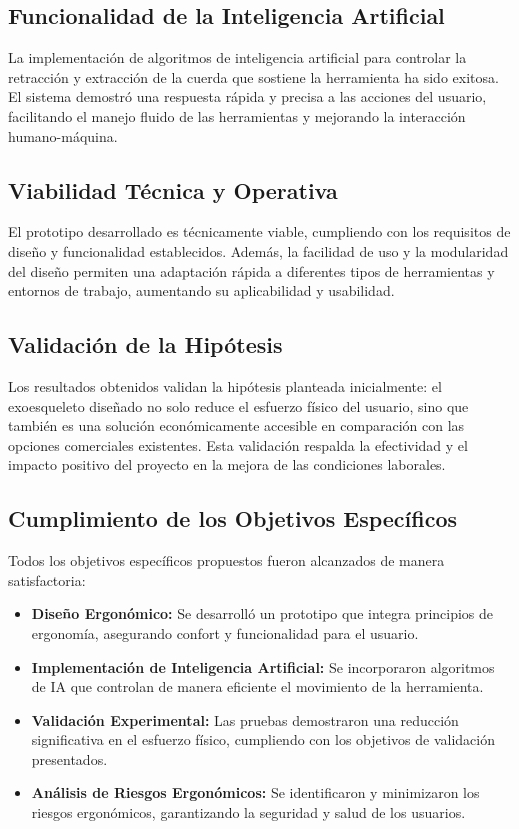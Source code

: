 \subsection{Funcionalidad de la Inteligencia Artificial}
La implementación de algoritmos de inteligencia artificial para controlar la retracción y extracción de la cuerda que sostiene la herramienta ha sido exitosa. El sistema demostró una respuesta rápida y precisa a las acciones del usuario, facilitando el manejo fluido de las herramientas y mejorando la interacción humano-máquina.

\subsection{Viabilidad Técnica y Operativa}
El prototipo desarrollado es técnicamente viable, cumpliendo con los requisitos de diseño y funcionalidad establecidos. Además, la facilidad de uso y la modularidad del diseño permiten una adaptación rápida a diferentes tipos de herramientas y entornos de trabajo, aumentando su aplicabilidad y usabilidad.

\subsection{Validación de la Hipótesis}
Los resultados obtenidos validan la hipótesis planteada inicialmente: el exoesqueleto diseñado no solo reduce el esfuerzo físico del usuario, sino que también es una solución económicamente accesible en comparación con las opciones comerciales existentes. Esta validación respalda la efectividad y el impacto positivo del proyecto en la mejora de las condiciones laborales.

\subsection{Cumplimiento de los Objetivos Específicos}
Todos los objetivos específicos propuestos fueron alcanzados de manera satisfactoria:
\begin{itemize}
    \item \textbf{Diseño Ergonómico:} Se desarrolló un prototipo que integra principios de ergonomía, asegurando confort y funcionalidad para el usuario.
    \item \textbf{Implementación de Inteligencia Artificial:} Se incorporaron algoritmos de IA que controlan de manera eficiente el movimiento de la herramienta.
    \item \textbf{Validación Experimental:} Las pruebas demostraron una reducción significativa en el esfuerzo físico, cumpliendo con los objetivos de validación presentados.
    \item \textbf{Análisis de Riesgos Ergonómicos:} Se identificaron y minimizaron los riesgos ergonómicos, garantizando la seguridad y salud de los usuarios.
\end{itemize}

